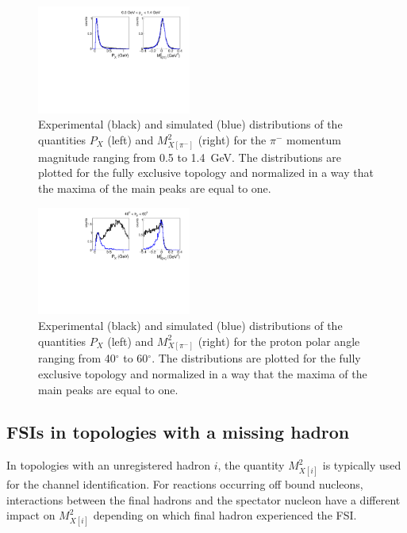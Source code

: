 \documentclass[prc,twocolumn,superscriptaddress,showpacs,amssymb,amsmath,amsfonts,aps,nofootinbib]{revtex4-1}
\begin{document}
\begin{figure}[htp]
\begin{center}
\includegraphics[width=0.45\textwidth]{pictures/fsi/quasi_free2.pdf}
\caption{\small Experimental (black) and simulated (blue) distributions of the quantities $P_{X}$ (left) and $M^{2}_{X[\pi^{-}]}$ (right) for the $\pi^{-}$ momentum magnitude ranging from 0.5 to 1.4~GeV. The distributions are plotted for the fully exclusive topology and normalized in a way that the maxima of the main peaks are equal to one.} \label{fig:fsi_pim_mom}
\end{center}
\end{figure}

\begin{figure}[htp]
\begin{center}
\includegraphics[width=0.45\textwidth]{pictures/fsi/fsi2.pdf}
\caption{\small Experimental (black) and simulated (blue) distributions of the quantities $P_{X}$ (left) and $M^{2}_{X[\pi^{-}]}$ (right) for the proton polar angle ranging from 40$^{\circ}$ to 60$^{\circ}$. The distributions are plotted for the fully exclusive topology and normalized in a way that the maxima of the main peaks are equal to one.} \label{fig:fsi_pr_ang}
\end{center}
\end{figure}


\subsection{FSIs in topologies with a missing hadron}
\label{sect:fsi_top_miss}

In topologies with an unregistered hadron $i$, the quantity $M^{2}_{X[i]}$ is typically used for the channel identification. For reactions occurring off bound nucleons, interactions between the final hadrons and the spectator nucleon have a different impact on $M^{2}_{X[i]}$ depending on which final hadron experienced the FSI.
\end{document}
